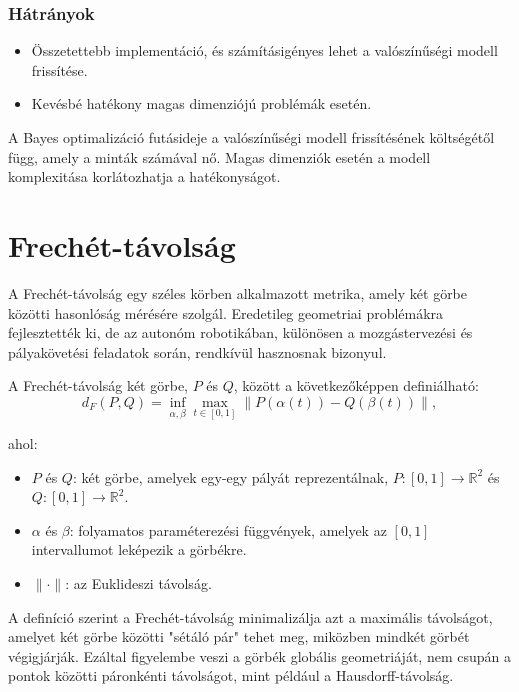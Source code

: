\subsubsection{Hátrányok}
\begin{itemize}
    \item Összetettebb implementáció, és számításigényes lehet a valószínűségi modell frissítése.
    \item Kevésbé hatékony magas dimenziójú problémák esetén.
\end{itemize}

A Bayes optimalizáció futásideje a valószínűségi modell frissítésének költségétől függ, amely a minták számával nő. Magas dimenziók esetén a modell komplexitása korlátozhatja a hatékonyságot.

\section{Frechét-távolság}
A Frechét-távolság egy széles körben alkalmazott metrika, amely két görbe közötti hasonlóság mérésére szolgál. Eredetileg geometriai problémákra fejlesztették ki, de az autonóm robotikában, különösen a mozgástervezési és pályakövetési feladatok során, rendkívül hasznosnak bizonyul. 

A Frechét-távolság két görbe, \( P \) és \( Q \), között a következőképpen definiálható:
\begin{equation}
    d_F(P, Q) = \inf_{\alpha, \beta} \max_{t \in [0,1]} \| P(\alpha(t)) - Q(\beta(t)) \|,
\end{equation}

ahol:
\begin{itemize}
    \item \( P \) és \( Q \): két görbe, amelyek egy-egy pályát reprezentálnak, \( P : [0,1] \to \mathbb{R}^2 \) és \( Q : [0,1] \to \mathbb{R}^2 \).
    \item \( \alpha \) és \( \beta \): folyamatos paraméterezési függvények, amelyek az \( [0,1] \) intervallumot leképezik a görbékre.
    \item \( \| \cdot \| \): az Euklideszi távolság.
\end{itemize}

A definíció szerint a Frechét-távolság minimalizálja azt a maximális távolságot, amelyet két görbe közötti "sétáló pár" tehet meg, miközben mindkét görbét végigjárják. Ezáltal figyelembe veszi a görbék globális geometriáját, nem csupán a pontok közötti páronkénti távolságot, mint például a Hausdorff-távolság.

